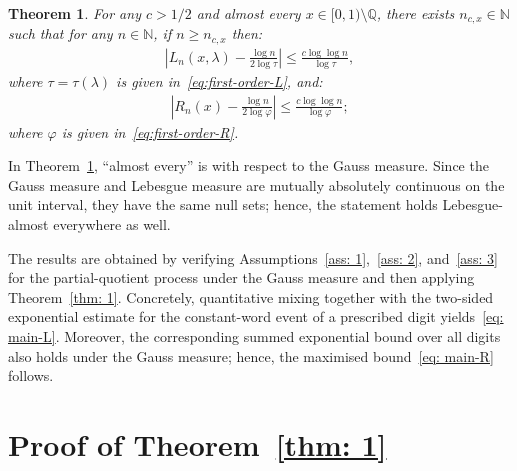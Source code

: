 \documentclass[12pt,reqno]{amsart}
\theoremstyle{definition}
\theoremstyle{plain}
\newtheorem{thm}{Theorem}
\begin{document}
\begin{thm}\label{thm: 2}
For any $c>1/2$ and almost every $x\in[0,1)\setminus\mathbb{Q}$, there exists $n_{c,x}\in\mathbb N$ such that for any $n\in\mathbb{N}$, if $n\geq n_{c,x}$ then:
\begin{align}\label{eq: main-L}
    \left|L_n(x,\lambda)-\frac{\log{n}}{2\log{\tau}}\right|
    \leq \frac{c\log{\log{n}}}{\log\tau},
\end{align}
where \(\tau=\tau(\lambda)\) is given in~\eqref{eq:first-order-L}, and:
\begin{align}\label{eq: main-R}
    \left|R_n(x)-\frac{\log{n}}{2\log{\varphi}}\right|
    \leq \frac{c\log{\log{n}}}{\log\varphi};
\end{align}
where $\varphi$ is given in~\eqref{eq:first-order-R}.
\end{thm}

In Theorem~\ref{thm: 2}, ``almost every'' is with respect to the Gauss measure. Since the Gauss measure and Lebesgue measure are mutually absolutely continuous on the unit interval, they have the same null sets; hence, the statement holds Lebesgue-almost everywhere as well.

The results are obtained by verifying Assumptions~\ref{ass: 1},~\ref{ass: 2}, and~\ref{ass: 3} for the partial-quotient process under the Gauss measure and then applying Theorem~\ref{thm: 1}. Concretely, quantitative mixing together with the two-sided exponential estimate for the constant-word event of a prescribed digit yields~\eqref{eq: main-L}. Moreover, the corresponding summed exponential bound over all digits also holds under the Gauss measure; hence, the maximised bound~\eqref{eq: main-R} follows.

\section{Proof of Theorem~\ref{thm: 1}}
\end{document}
